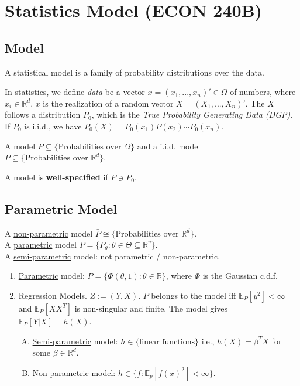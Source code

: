 \documentclass[11pt]{elegantbook}
\begin{document}
\section{Statistics Model (ECON 240B)}
\subsection{Model}
A statistical model is a family of probability distributions over the data.

In statistics, we define \textit{data} be a vector $x=(x_1,...,x_n)'\in\Omega$ of numbers, where $x_i\in \mathbb{R}^d$. $x$ is the realization of a random vector $X=(X_1,...,X_n)'$. The $X$ follows a distribution $P_0$, which is the \textit{True Probability Generating Data (DGP)}. If $P_0$ is i.i.d., we have $P_0(X)=P_0(x_1)P(x_2)\cdots P_0(x_n)$.

\begin{definition}[Model]
    \normalfont
    A model $P\subseteq \{\text{Probabilities over }\Omega\}$ and a i.i.d. model $P\subseteq \{\text{Probabilities over }\mathbb{R}^d\}$.
\end{definition}

\begin{definition}
    \normalfont
    A model is \textbf{well-specified} if $P\ni P_0$.
\end{definition}

\subsection{Parametric Model}
\begin{definition}
    \normalfont
    A \underline{non-parametric} model $\bar{P}\cong \{\text{Probabilities over }\mathbb{R}^d\}$.\\
    A \underline{parametric} model $P=\{P_\theta:\theta\in\Theta\subseteq \mathbb{R}^v\}$.\\
    A \underline{semi-parametric} model: not parametric / non-parametric.
\end{definition}

\begin{example}
    \begin{enumerate}
        \item \underline{Parametric} model: $P=\{\Phi(\theta,1):\theta\in \mathbb{R}\}$, where $\Phi$ is the Gaussian c.d.f.
        \item Regression Models. $Z:=(Y,X)$. $P$ belongs to the model iff $\mathbb{E}_P[y^2]<\infty$ and $\mathbb{E}_P[XX^T]$ is non-singular and finite. The model gives $\mathbb{E}_P[Y|X]=h(X)$.
        \begin{enumerate}[(A).]
            \item \underline{Semi-parametric} model: $h\in\{\text{linear functions}\}$ i.e., $h(X)=\beta^TX$ for some $\beta\in \mathbb{R}^d$.
            \item \underline{Non-parametric} model: $h\in\{f:\mathbb{E}_p[f(x)^2]<\infty\}$.
        \end{enumerate}
    \end{enumerate}
\end{example}
\end{document}
